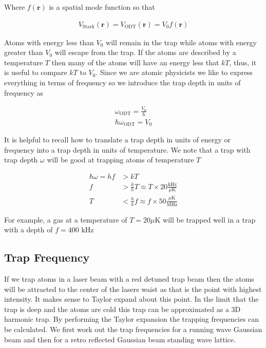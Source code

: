 \documentclass[12pt]{article}
\newcommand{\bv}[1]{\boldsymbol{#1}}
\begin{document}
Where $f(\bv{r})$ is a spatial mode function so that

\begin{align}
V_{\text{Stark}}(\bv{r}) = V_{\text{ODT}}(\bv{r}) = V_0 f(\bv{r})
\end{align}

Atoms with energy less than $V_0$ will remain in the trap while atoms with energy greater than $V_0$ will escape from the trap. If the atoms are described by a temperature $T$ then many of the atoms will have an energy less that $kT$, thus, it is useful to compare $kT$ to $V_0$. Since we are atomic physicists we like to express everything in terms of frequency so we introduce the trap depth in units of frequency as 

\begin{align}
\omega_{\text{ODT}} = \frac{V_0}{\hbar}\\
\hbar \omega_{\text{ODT}} = V_0
\end{align}

It is helpful to recall how to translate a trap depth in units of energy or frequency into a trap depth in units of temperature. We note that a trap with trap depth $\omega$ will be good at trapping atoms of temperature $T$

\begin{align}
\hbar \omega = h f &> kT\\
f &> \frac{k}{h} T \approx T \times 20 \frac{\text{kHz}}{\mu\text{K}} \\
T &< \frac{h}{k} f \approx f \times 50 \frac{\mu\text{K}}{\text{MHz}}
\end{align}

For example, a gas at a temperature of $T =20 \mu\text{K}$ will be trapped well in a trap with a depth of $f = 400 \text{ kHz}$

\subsection{Trap Frequency}

If we trap atoms in a laser beam with a red detuned trap beam then the atoms will be attracted to the center of the lasers waist as that is the point with highest intensity. It makes sense to Taylor expand about this point. In the limit that the trap is deep and the atoms are cold this trap can be approximated as a 3D harmonic trap. By performing the Taylor expansion the trapping frequencies can be calculated. We first work out the trap frequencies for a running wave Gaussian beam and then for a retro reflected Gaussian beam standing wave lattice. 
\end{document}
